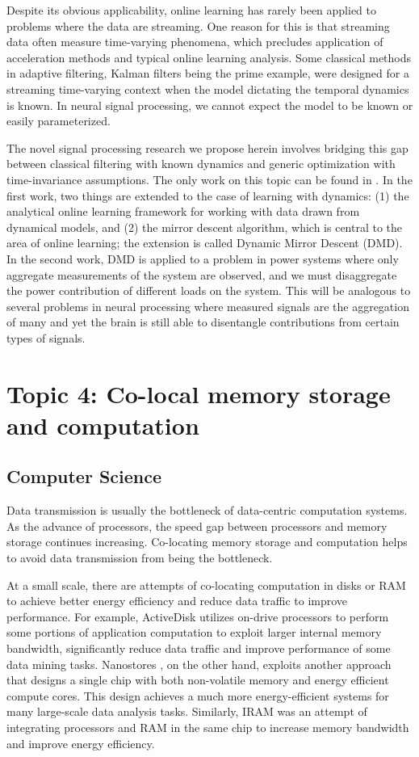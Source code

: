 \documentclass[12pt]{report}
\begin{document}
Despite its obvious applicability, online learning has rarely been applied to problems where the data are streaming. One reason for this is that streaming data often measure time-varying phenomena, which precludes application of acceleration methods and typical online learning analysis. Some classical methods in adaptive filtering, Kalman filters being the prime example, were designed for a streaming time-varying context when the model dictating the temporal dynamics is known. In neural signal processing, we cannot expect the model to be known or easily parameterized.

The novel signal processing research we propose herein involves bridging this gap between classical filtering with known dynamics and generic optimization with time-invariance assumptions. The only work on this topic can be found in \cite{hall_online_2013, ledva2015inferring}. In the first work, two things are extended to the case of learning with dynamics: (1) the analytical online learning framework for working with data drawn from dynamical models, and (2) the mirror descent algorithm, which is central to the area of online learning; the extension is called Dynamic Mirror Descent (DMD). In the second work, DMD is applied to a problem in power systems where only aggregate measurements of the system are observed, and we must disaggregate the power contribution of different loads on the system. This will be analogous to several problems in neural processing where measured signals are the aggregation of many and yet the brain is still able to disentangle contributions from certain types of signals.

\section*{Topic 4: Co-local memory storage and computation}

\subsection*{Computer Science}
Data transmission is usually the bottleneck of data-centric computation systems.
As the advance of processors, the speed gap between processors and memory
storage continues increasing. Co-locating memory storage and computation helps
to avoid data transmission from being the bottleneck.

At a small scale, there are attempts of co-locating computation in disks or RAM
to achieve better energy efficiency and reduce data traffic to improve
performance. For example, ActiveDisk \cite{riedel01, cho13} utilizes on-drive
processors to
perform some portions of application computation to exploit larger internal
memory bandwidth, significantly reduce data traffic and improve performance of
some data mining tasks. Nanostores \cite{nanostores}, on the other hand, exploits another
approach that designs a single chip with both non-volatile memory and energy
efficient compute cores. This design achieves a much more energy-efficient
systems for many large-scale data analysis tasks. Similarly, IRAM \cite{iram} was an
attempt of integrating processors and RAM in the same chip to increase memory
bandwidth and improve energy efficiency.
\end{document}
